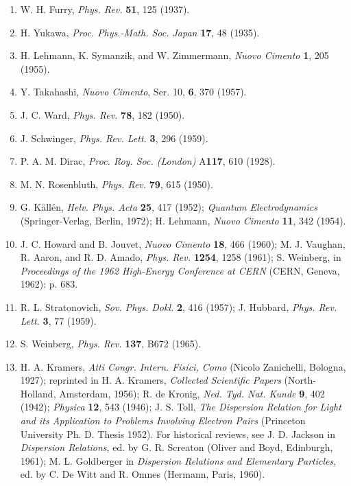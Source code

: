 \begin{enumerate}
\item \label{ref:10.1}W. H. Furry, \emph{Phys. Rev.} \textbf{51}, 125 (1937).

\item \label{ref:10.2}H. Yukawa, \emph{Proc. Phys.-Math. Soc. Japan} \textbf{17},
48 (1935).

\item \label{ref:10.3}H. Lehmann, K. Symanzik, and W. Zimmermann, \emph{Nuovo
Cimento} \textbf{1}, 205 (1955).

\item \label{ref:10.4}Y. Takahashi, \emph{Nuovo Cimento}, Ser. 10, \textbf{6},
370 (1957).

\item \label{ref:10.5}J. C. Ward, \emph{Phys. Rev.} \textbf{78}, 182 (1950).

\item \label{ref:10.6}J. Schwinger, \emph{Phys. Rev. Lett.} \textbf{3}, 296
(1959).

\item \label{ref:10.7}P. A. M. Dirac, \emph{Proc. Roy. Soc. (London)} A\textbf{117},
610 (1928).

\item \label{ref:10.8}M. N. Rosenbluth, \emph{Phys. Rev.} \textbf{79}, 615
(1950).

\item \label{ref:10.9}G. K\"all\'en, \emph{Helv. Phys. Acta} \textbf{25}, 417
(1952); \emph{Quantum Electrodynamics} (Springer-Verlag, Berlin, 1972);
H. Lehmann, \emph{Nuovo Cimento} \textbf{11}, 342 (1954).

\item \label{ref:10.10}J. C. Howard and B. Jouvet, \emph{Nuovo Cimento}
\textbf{18}, 466 (1960); M. J. Vaughan, R. Aaron, and R. D. Amado,
\emph{Phys. Rev.} \textbf{1254}, 1258 (1961); S. Weinberg, in \emph{Proceedings
of the 1962 High-Energy Conference at CERN} (CERN, Geneva, 1962): p. 683.

\item \label{ref:10.11}R. L. Stratonovich, \emph{Sov. Phys. Dokl.} \textbf{2},
416 (1957); J. Hubbard, \emph{Phys. Rev. Lett.} \textbf{3}, 77 (1959).

\item \label{ref:10.12}S. Weinberg, \emph{Phys. Rev.} \textbf{137}, B672
(1965).

\item \label{ref:10.13}H. A. Kramers, \emph{Atti Congr. Intern. Fisici, Como}
(Nicolo Zanichelli, Bologna, 1927); reprinted in H. A. Kramers, \emph{Collected
Scientific Papers} (North-Holland, Amsterdam, 1956); R. de Kronig,
\emph{Ned. Tyd. Nat. Kunde} \textbf{9}, 402 (1942); \emph{Physica} \textbf{12},
543 (1946); J. S. Toll, \emph{The Dispersion Relation for Light and its
Application to Problems Involving Electron Pairs} (Princeton University
Ph. D. Thesis 1952). For historical reviews, see J. D. Jackson in
\emph{Dispersion Relations}, ed. by G. R. Screaton (Oliver and Boyd, Edinburgh,
1961); M. L. Goldberger in \emph{Dispersion Relations and Elementary
Particles}, ed. by C. De Witt and R. Omnes (Hermann, Paris, 1960).


\end{enumerate}
